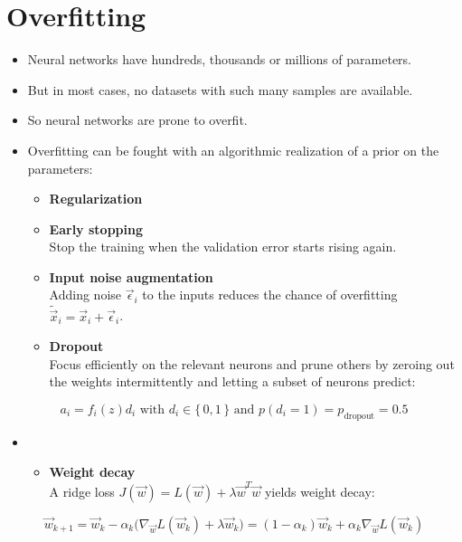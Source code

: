 	\section{Overfitting}
		\begin{itemize}
			\item Neural networks have hundreds, thousands or millions of parameters.
			\item But in most cases, no datasets with such many samples are available.
			\item So neural networks are prone to overfit.
			\item Overfitting can be fought with an algorithmic realization of a prior on the parameters:
				\begin{itemize}
					\item \textbf{Regularization}
					\item \textbf{Early stopping} \\ Stop the training when the validation error starts rising again.
					\item \textbf{Input noise augmentation} \\ Adding noise \(\vec{\epsilon}_i\) to the inputs reduces the chance of overfitting \( \tilde{\vec{x}}_i = \vec{x}_i + \vec{\epsilon}_i \).
					\item \textbf{Dropout} \\ Focus efficiently on the relevant neurons and prune others by zeroing out the weights intermittently and letting a subset of neurons predict:
				\end{itemize}
		\end{itemize}
		\begin{equation}
			a_i = f_i(z) d_i \textrm{ with } d_i \in \{\, 0, 1 \,\} \textrm{ and } p(d_i = 1) = p_\textrm{dropout} = 0.5
		\end{equation}
		\begin{itemize}
			\item[]
				\begin{itemize}
					\item \textbf{Weight decay} \\ A ridge loss \( J(\vec{w}) = L(\vec{w}) + \lambda \vec{w}^T \vec{w} \) yields weight decay:
				\end{itemize}
		\end{itemize}
		\begin{equation}
			\vec{w}_{k + 1} = \vec{w}_k - \alpha_k \big( \nabla_{\vec{w}} L(\vec{w}_k) + \lambda \vec{w}_k \big) = (1 - \alpha_k) \vec{w}_k + \alpha_k \nabla_{\vec{w}} L(\vec{w}_k)
		\end{equation}

